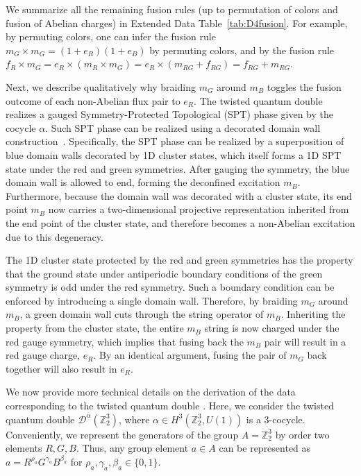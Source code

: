 \documentclass[nofootinbib,pra,twocolumn,showpacs,superscriptaddress,notitlepage,amsmath]{revtex4-2} %
\def\ZZ{\mathbb Z}
\begin{document}
We summarize all the remaining fusion rules (up to permutation of colors and fusion of Abelian charges) in Extended Data Table~\ref{tab:D4fusion}. For example, by permuting colors, one can infer the fusion rule $m_G \times m_G = (1+e_R)(1+e_B)$ by permuting colors, and by the fusion rule $f_R \times m_G = e_R \times (m_R \times m_G) = e_R \times (m_{RG}+f_{RG}) = f_{RG} + m_{RG}$.

Next, we describe qualitatively why braiding $m_G$ around $m_B$ toggles the fusion outcome of each non-Abelian flux pair to $e_R$. The twisted quantum double realizes a gauged Symmetry-Protected Topological (SPT) phase given by the cocycle $\alpha$. Such SPT phase can be realized using a decorated domain wall construction~\cite{chen_symmetry-protected_2014,yoshida_topological_2016}. Specifically, the SPT phase can be realized by a superposition of blue domain walls decorated by 1D cluster states, which itself forms a 1D SPT state under the red and green symmetries. After gauging the symmetry, the blue domain wall is allowed to end, forming the deconfined excitation $m_B$. Furthermore, because the domain wall was decorated with a cluster state, its end point $m_B$ now carries a two-dimensional projective representation inherited from the end point of the cluster state, and therefore becomes a non-Abelian excitation due to this degeneracy.

The 1D cluster state protected by the red and green symmetries has the property that the ground state under antiperiodic boundary conditions of the green symmetry is odd under the red symmetry. Such a boundary condition can be enforced by introducing a single domain wall. Therefore, by braiding $m_G$ around $m_B$, a green domain wall cuts through the string operator of $m_B$. Inheriting the property from the cluster state, the entire $m_B$ string is now charged under the red gauge symmetry, which implies that fusing back the $m_B$ pair will result in a red gauge charge, $e_R$. By an identical argument, fusing the pair of $m_G$ back together will also result in $e_R$.



We now provide more technical details on the derivation of the data corresponding to the twisted quantum double \cite{propitius_topological_1995}. Here, we consider the twisted quantum double $\mathcal D^\alpha(\ZZ_2^3)$, where $\alpha \in H^3(\ZZ_2^3,U(1))$ is a 3-cocycle. Conveniently, we represent the generators of the group $A=\ZZ_2^3$ by order two elements $R,G,B$. Thus, any group element $a \in A$ can be represented as $a=R^{\rho_a} G^{\gamma_a}B^{\beta_a}$ for $\rho_a,\gamma_a,\beta_a \in \{0,1\}$.  
 
\end{document}
